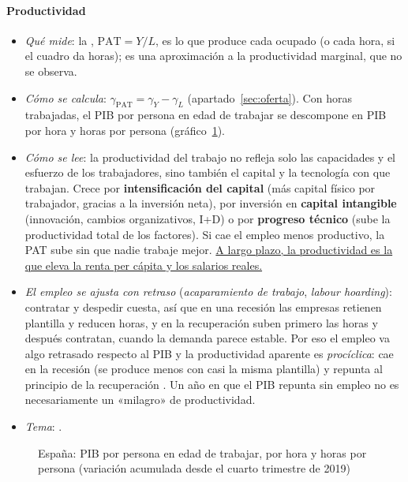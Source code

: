 \documentclass[11pt]{article}
\begin{document}
\paragraph{Productividad}
\begin{itemize}
\item \emph{Qué mide}: la , $\mathrm{PAT}=Y/L$, es lo que produce cada ocupado (o cada hora, si el cuadro da horas); es una aproximación a la productividad marginal, que no se observa.
\item \emph{Cómo se calcula}: $\gamma_{\mathrm{PAT}}=\gamma_Y-\gamma_L$ (apartado~\ref{sec:oferta}). Con horas trabajadas, el PIB por persona en edad de trabajar se descompone en PIB por hora y horas por persona (gráfico~\ref{fig:pib-por-pet}).
\item \emph{Cómo se lee}: la productividad del trabajo no refleja solo las capacidades y el esfuerzo de los trabajadores, sino también el capital y la tecnología con que trabajan. Crece por \textbf{intensificación del capital} (más capital físico por trabajador, gracias a la inversión neta), por inversión en \textbf{capital intangible} (innovación, cambios organizativos, I+D) o por \textbf{progreso técnico} (sube la productividad total de los factores). Si cae el empleo menos productivo, la PAT sube sin que nadie trabaje mejor. \uline{A largo plazo, la productividad es la que eleva la renta per cápita y los salarios reales.}
\item \emph{El empleo se ajusta con retraso} (\emph{acaparamiento de trabajo}, \emph{labour hoarding}): contratar y despedir cuesta, así que en una recesión las empresas retienen plantilla y reducen horas, y en la recuperación suben primero las horas y después contratan, cuando la demanda parece estable. Por eso el empleo va algo retrasado respecto al PIB y la productividad aparente es \emph{procíclica}: cae en la recesión (se produce menos con casi la misma plantilla) y repunta al principio de la recuperación \parencite{Biddle2014LaborHoarding}. Un año en que el PIB repunta sin empleo no es necesariamente un «milagro» de productividad.
\item \emph{Tema}:  .
\end{itemize}

\begin{figure}[!htb]
\centering
\caption{España: PIB por persona en edad de trabajar, por hora y horas por persona (variación acumulada desde el cuarto trimestre de 2019)}\label{fig:pib-por-pet}
\end{figure}
\end{document}
